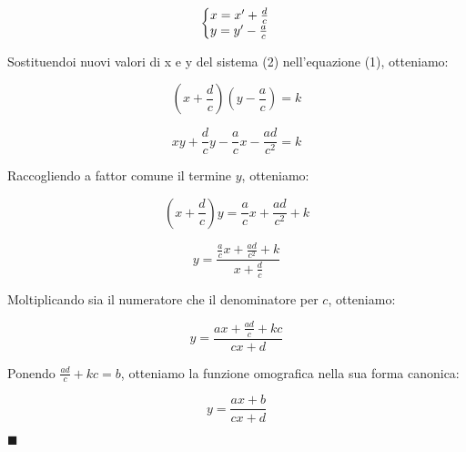 \documentclass[10pt,a4paper]{article}
\begin{document}
	\begin{equation}
		\left\{\begin{array}{@{}l@{}}
			x = x'+\frac{d}{c}\\
			y = y'-\frac{a}{c}
		\end{array}\right.\,
	\end{equation}

	Sostituendoi nuovi valori di x e y del sistema (2) nell'equazione (1), otteniamo:
	
	\begin{equation*}
		\left(x+\frac{d}{c}\right)\left(y-\frac{a}{c}\right)=k
	\end{equation*}

	\begin{equation*}
		xy + \frac{d}{c} y - \frac{a}{c} x - \frac{ad}{c^2}=k
	\end{equation*}

	Raccogliendo a fattor comune il termine $y$, otteniamo:
	
	\begin{equation*}
		\left( x+\frac{d}{c} \right) y = \frac{a}{c} x + \frac{ad}{c^2} + k
	\end{equation*}

	\begin{equation*}
		y = \frac{\frac{a}{c} x + \frac{ad}{c^2} + k}{x+\frac{d}{c}}
	\end{equation*}

	Moltiplicando sia il numeratore che il denominatore per $c$, otteniamo:
	
	\begin{equation*}
		y = \frac{ax + \frac{ad}{c} + kc}{cx+d}
	\end{equation*}

	Ponendo $\frac{ad}{c} + kc = b$, otteniamo la funzione omografica nella sua forma canonica:
	
	\begin{equation}
		y = \frac{ax+b}{cx+d}
	\end{equation}
	
	\hfill $\blacksquare$
	
\end{document}
